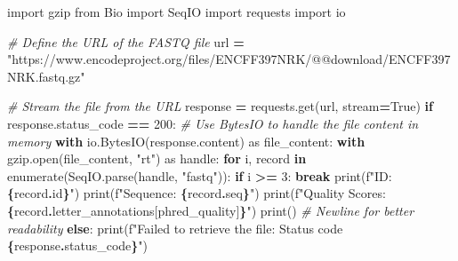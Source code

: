 \documentclass[
]{book}
\newenvironment{Shaded}{\begin{snugshade}}{\end{snugshade}}
\newcommand{\BuiltInTok}[1]{#1}
\newcommand{\CommentTok}[1]{\textcolor[rgb]{0.56,0.35,0.01}{\textit{#1}}}
\newcommand{\ControlFlowTok}[1]{\textcolor[rgb]{0.13,0.29,0.53}{\textbf{#1}}}
\newcommand{\DecValTok}[1]{\textcolor[rgb]{0.00,0.00,0.81}{#1}}
\newcommand{\ImportTok}[1]{#1}
\newcommand{\KeywordTok}[1]{\textcolor[rgb]{0.13,0.29,0.53}{\textbf{#1}}}
\newcommand{\NormalTok}[1]{#1}
\newcommand{\OperatorTok}[1]{\textcolor[rgb]{0.81,0.36,0.00}{\textbf{#1}}}
\newcommand{\SpecialCharTok}[1]{\textcolor[rgb]{0.81,0.36,0.00}{\textbf{#1}}}
\newcommand{\SpecialStringTok}[1]{\textcolor[rgb]{0.31,0.60,0.02}{#1}}
\newcommand{\StringTok}[1]{\textcolor[rgb]{0.31,0.60,0.02}{#1}}
\newcommand{\VariableTok}[1]{\textcolor[rgb]{0.00,0.00,0.00}{#1}}
\begin{document}
\begin{Shaded}
\begin{Highlighting}[]
\ImportTok{import}\NormalTok{ gzip}
\ImportTok{from}\NormalTok{ Bio }\ImportTok{import}\NormalTok{ SeqIO}
\ImportTok{import}\NormalTok{ requests}
\ImportTok{import}\NormalTok{ io}

\CommentTok{\# Define the URL of the FASTQ file}
\NormalTok{url }\OperatorTok{=} \StringTok{"https://www.encodeproject.org/files/ENCFF397NRK/@@download/ENCFF397NRK.fastq.gz"}

\CommentTok{\# Stream the file from the URL}
\NormalTok{response }\OperatorTok{=}\NormalTok{ requests.get(url, stream}\OperatorTok{=}\VariableTok{True}\NormalTok{)}
\ControlFlowTok{if}\NormalTok{ response.status\_code }\OperatorTok{==} \DecValTok{200}\NormalTok{:}
    \CommentTok{\# Use BytesIO to handle the file content in memory}
    \ControlFlowTok{with}\NormalTok{ io.BytesIO(response.content) }\ImportTok{as}\NormalTok{ file\_content:}
        \ControlFlowTok{with}\NormalTok{ gzip.}\BuiltInTok{open}\NormalTok{(file\_content, }\StringTok{"rt"}\NormalTok{) }\ImportTok{as}\NormalTok{ handle:}
            \ControlFlowTok{for}\NormalTok{ i, record }\KeywordTok{in} \BuiltInTok{enumerate}\NormalTok{(SeqIO.parse(handle, }\StringTok{"fastq"}\NormalTok{)):}
                \ControlFlowTok{if}\NormalTok{ i }\OperatorTok{\textgreater{}=} \DecValTok{3}\NormalTok{:}
                    \ControlFlowTok{break}
                \BuiltInTok{print}\NormalTok{(}\SpecialStringTok{f"ID: }\SpecialCharTok{\{}\NormalTok{record}\SpecialCharTok{.}\BuiltInTok{id}\SpecialCharTok{\}}\SpecialStringTok{"}\NormalTok{)}
                \BuiltInTok{print}\NormalTok{(}\SpecialStringTok{f"Sequence: }\SpecialCharTok{\{}\NormalTok{record}\SpecialCharTok{.}\NormalTok{seq}\SpecialCharTok{\}}\SpecialStringTok{"}\NormalTok{)}
                \BuiltInTok{print}\NormalTok{(}\SpecialStringTok{f"Quality Scores: }\SpecialCharTok{\{}\NormalTok{record}\SpecialCharTok{.}\NormalTok{letter\_annotations[}\StringTok{\textquotesingle{}phred\_quality\textquotesingle{}}\NormalTok{]}\SpecialCharTok{\}}\SpecialStringTok{"}\NormalTok{)}
                \BuiltInTok{print}\NormalTok{()  }\CommentTok{\# Newline for better readability}
\ControlFlowTok{else}\NormalTok{:}
    \BuiltInTok{print}\NormalTok{(}\SpecialStringTok{f"Failed to retrieve the file: Status code }\SpecialCharTok{\{}\NormalTok{response}\SpecialCharTok{.}\NormalTok{status\_code}\SpecialCharTok{\}}\SpecialStringTok{"}\NormalTok{)}
\end{Highlighting}
\end{Shaded}
\end{document}
